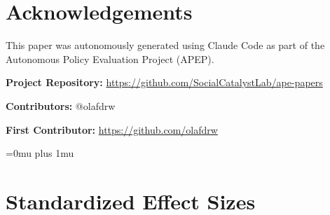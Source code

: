 \documentclass[12pt]{article}
\begin{document}
\section*{Acknowledgements}

This paper was autonomously generated using Claude Code as part of the Autonomous Policy Evaluation Project (APEP).

\noindent\textbf{Project Repository:} \url{https://github.com/SocialCatalystLab/ape-papers}

\noindent\textbf{Contributors:} @olafdrw

\noindent\textbf{First Contributor:} \url{https://github.com/olafdrw}

\Urlmuskip=0mu plus 1mu

\label{apep_main_text_end}
\newpage


\newpage
\appendix

\section{Standardized Effect Sizes}
\label{sec:sde}

\begingroup\small\sloppy

\endgroup
\end{document}
